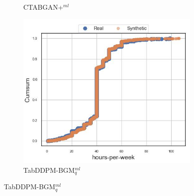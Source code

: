 \begin{figure}[H]
\begin{subfigure}{0.32\textwidth}
		\caption{CTABGAN+$^{ml}$}
	\end{subfigure}
	\begin{subfigure}{0.32\textwidth}
		\centering
		\includegraphics[width=\textwidth]{images/cdf_hpw/tab-ddpm-bgm.jpg}
		\caption{TabDDPM-BGM$^{ml}_q$}
	\end{subfigure}



\end{figure}
